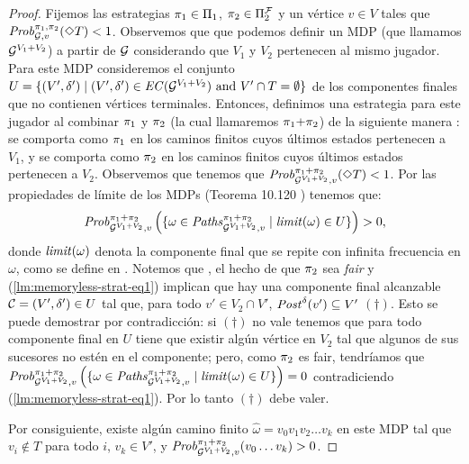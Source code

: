 \begin{proof}
  Fijemos las estrategias $\pi_{1} \in \Pi_{1}$, $\pi_{2} \in
  \Pi^{\mathcal{F}}_{2}$ y un vértice $v \in V$ tales que
  $\mathit{Prob}^{\pi_{1}, \pi_{2}}_{\mathcal{G}, v}(\Diamond T) < 1$.
  Observemos que que podemos definir un MDP (que llamamos $\mathcal{G}^{V_1{+}V_2}$) a partir de
  $\mathcal{G}$ considerando que $V_1$ y $V_2$ pertenecen al mismo jugador.  Para este MDP consideremos el conjunto $U = \{ (V',\delta')
  \mid(V',\delta') \in \mathit{EC}(\mathcal{G}^{V_1{+}V_2}) \text{ and }
  V'\cap T = \emptyset \}$ de los componentes finales que no contienen vértices terminales. Entonces, definimos una estrategia para este jugador al combinar
  $\pi_{1}$ y $\pi_{2}$ (la cual llamaremos $\pi_{1}{+}\pi_{2}$) de la siguiente manera
  : se comporta como $\pi_{1}$ en los caminos finitos cuyos últimos estados pertenecen a $V_1$, y se comporta como $\pi_{2}$ en los caminos finitos cuyos últimos estados pertenecen a $V_2$. Observemos que tenemos que
  $\mathit{Prob}^{\pi_{1}{+}\pi_{2}}_{\mathcal{G}^{V_1+V_2},v}(\Diamond T) <
  1$. Por las propiedades de límite de los MDPs (Teorema 10.120 \cite{BaierK08})
  tenemos que:
  \begin{equation}\label{lm:memoryless-strat-eq1}
    \mathit{Prob}^{\pi_{1}{+}\pi_{2}}_{\mathcal{G}^{V_1+V_2},v} \left(\{ \omega \in \mathit{Paths}^{\pi_{1}{+}\pi_{2}}_{\mathcal{G}^{V_1+V_2},v} \mid \mathit{limit}(\omega)  \in U \}\right) > 0,
  \end{equation}
  donde $\mathit{limit}(\omega)$ denota la componente final que se repite con infinita frecuencia en $\omega$, como se define en \cite{BaierK08}.  Notemos que
  , el hecho de que $\pi_{2}$ sea \emph{fair} y
  (\ref{lm:memoryless-strat-eq1}) implican que hay una componente final alcanzable $\mathcal{C}= (V',\delta') \in U$ tal que, para todo
  $v' \in V_2 \cap V'$, $\mathit{Post}^\delta(v') \subseteq V'$ $(\dag)$.
  Esto se puede demostrar por contradicción: si $(\dag)$ no vale tenemos que para todo componente final en $U$ tiene que existir
  algún vértice en
  $V_2$ tal que algunos de sus sucesores no estén en el componente; pero,
  como $\pi_{2}$ es fair, tendríamos que
  $\mathit{Prob}^{\pi_{1}{+}\pi_{2}}_{\mathcal{G}^{V_1+V_2},v} \left ( \{ \omega \in \mathit{Paths}^{\pi_{1}{+}\pi_{2}}_{\mathcal{G}^{V_1+V_2},v} \mid \mathit{limit}(\omega) \in U \}\right) = 0$
  contradiciendo (\ref{lm:memoryless-strat-eq1}). Por lo tanto $(\dag)$ debe valer.

  Por consiguiente, existe algún camino finito $\hat{\omega} = v_0 v_1 v_2 \dots v_k$
  en este MDP tal que $v_i \notin T$ para todo $i$, $v_k \in V'$, y
  $\mathit{Prob}^{\pi_{1}{+}\pi_{2}}_{\mathcal{G}^{V_1+V_2},v}(v_0\dots v_k) > 0$.


\end{proof}
